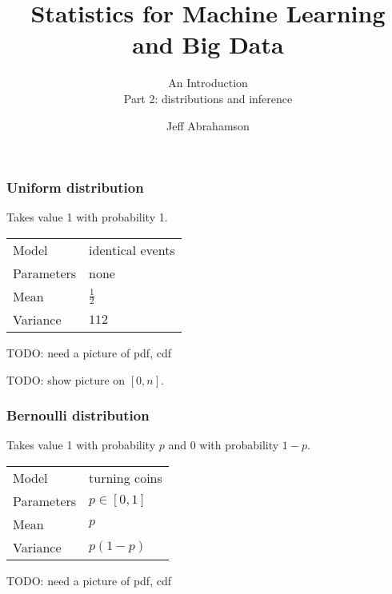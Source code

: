 \documentclass[t]{beamer}
\title
{Statistics for Machine Learning and Big Data}
\subtitle{An Introduction\\[6mm] Part 2: distributions and inference}
\author[Abrahamson] {Jeff Abrahamson}
\begin{document}
\begin{frame}
  \titlepage
\end{frame}


\begin{frame}
  \frametitle{Uniform distribution}

  Takes value 1 with probability 1.
  \bigskip
  
  \begin{tabular}{ll}
    Model & identical events\\[1mm]
    Parameters & none\\[1mm]
    Mean & $\frac 12$\\[1mm]
    Variance & $1{12}$
  \end{tabular}

  TODO: need a picture of pdf, cdf
  
  
  TODO: show picture on $[0,n]$.

\end{frame}
\begin{frame}
  \frametitle{Bernoulli distribution}

  Takes value 1 with probability $p$ and 0 with probability $1-p$.
  \bigskip
  
  \begin{tabular}{ll}
    Model & turning coins\\[1mm]
    Parameters & $p\in [0,1]$\\[1mm]
    Mean & $p$\\[1mm]
    Variance & $p(1-p)$
  \end{tabular}

  TODO: need a picture of pdf, cdf
  
  \note{

  }
  
\end{frame}
\end{document}
